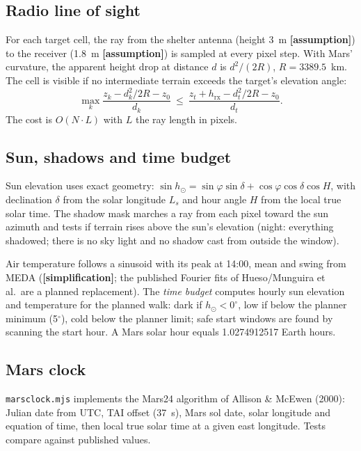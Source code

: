 \documentclass[11pt,a4paper]{article}
\newcommand{\hyp}[1]{\textcolor{marsred}{\textbf{[#1]}}}   %
\renewcommand{\_}{\textunderscore\allowbreak}
\newcommand{\code}[1]{\texttt{#1}}
\begin{document}
\subsection{Radio line of sight}
For each target cell, the ray from the shelter antenna (height 3~m \hyp{assumption}) to the receiver (1.8~m \hyp{assumption}) is sampled at every pixel step. With Mars' curvature, the apparent height drop at distance $d$ is $d^2/(2R)$, $R=3389.5$~km. The cell is visible if no intermediate terrain exceeds the target's elevation angle:
\[
\max_k \frac{z_k - d_k^2/2R - z_0}{d_k}\ \le\ \frac{z_t+h_\text{rx}-d_t^2/2R-z_0}{d_t}.
\]
The cost is $O(N\cdot L)$ with $L$ the ray length in pixels.

\subsection{Sun, shadows and time budget}
Sun elevation uses exact geometry: $\sin h_\odot=\sin\varphi\sin\delta+\cos\varphi\cos\delta\cos H$, with declination $\delta$ from the solar longitude $L_s$ and hour angle $H$ from the local true solar time. The shadow mask marches a ray from each pixel toward the sun azimuth and tests if terrain rises above the sun's elevation (night: everything shadowed; there is no sky light and no shadow cast from outside the window).

Air temperature follows a sinusoid with its peak at 14:00, mean and swing from MEDA (\hyp{simplification}; the published Fourier fits of Hueso/Munguira et al.\ are a planned replacement). The \emph{time budget} computes hourly sun elevation and temperature for the planned walk: dark if $h_\odot<0^\circ$, low if below the planner minimum (5$^\circ$), cold below the planner limit; safe start windows are found by scanning the start hour. A Mars solar hour equals 1.0274912517 Earth hours.

\subsection{Mars clock}
\code{marsclock.mjs} implements the Mars24 algorithm of Allison \& McEwen (2000): Julian date from UTC, TAI offset (37~s), Mars sol date, solar longitude and equation of time, then local true solar time at a given east longitude. Tests compare against published values.
\end{document}
